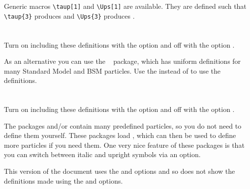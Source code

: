 \documentclass[mhchem,UKenglish,texlive=2016]{\ATLASLATEXPATH atlasdoc}
\begin{document}
Generic macros \verb|\taup[1]| and \verb|\Ups[1]| are available.
They are defined such that
\verb|\taup{3}| produces  and
\verb|\Ups{3}| produces .




\newpage
\section{}

Turn on including these definitions with the option  and off with the option .

As an alternative you can use the ~\cite{hepparticles} package,
which has uniform definitions for many Standard Model and BSM particles.
Use the  instead of  to use the  definitions.




\newpage
\section{}

Turn on including these definitions with the option  and off with the option .

The packages  and/or  contain many predefined particles,
so you do not need to define them yourself.
These packages load , which can then be used to define more particles if you need them.
One very nice feature of these packages is that you can switch between italic and upright symbols via an option.

This version of the document uses the  and  options and so
does not show the definitions made using the  and  options.
%







\printbibliography
\end{document}
